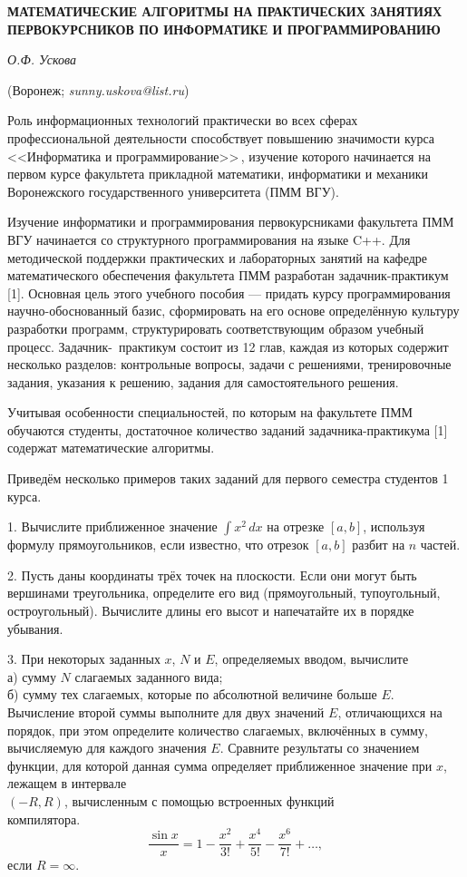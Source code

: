 \begin{center}
    {\bf МАТЕМАТИЧЕСКИЕ АЛГОРИТМЫ НА ПРАКТИЧЕСКИХ ЗАНЯТИЯХ ПЕРВОКУРСНИКОВ ПО ИНФОРМАТИКЕ И ПРОГРАММИРОВАНИЮ}

    {\it О.Ф. Ускова}

    (Воронеж; {\it sunny.uskova@list.ru})
\end{center}


Роль информационных технологий практически во всех сферах профессиональной деятельности способствует повышению значимости
курса <<Информатика и программирование>>\,, изучение которого начинается на первом курсе факультета прикладной математики,
информатики и механики Воронежского государственного университета \linebreak (ПММ ВГУ).

Изучение информатики и программирования первокурсниками факультета ПММ ВГУ начинается со структурного программирования
на языке C++. Для методической поддержки практических и лабораторных занятий на кафедре математического обеспечения
факультета ПММ разработан задачник-практикум [1]. Основная цель этого учебного пособия --- придать курсу программирования
научно-обоснованный базис, сформировать на его основе определённую культуру разработки программ, структурировать
соответствующим образом учебный процесс. Задачник-~практикум состоит из 12 глав, каждая из которых содержит несколько
разделов: контрольные вопросы, задачи с решениями, тренировочные задания, указания к решению, задания для самостоятельного
решения.

Учитывая особенности специальностей, по которым на факультете ПММ обучаются студенты, достаточное количество заданий
задачника-практикума [1] содержат математические алгоритмы.

Приведём несколько примеров таких заданий для первого семестра студентов 1 курса.

1. Вычислите приближенное значение $\int x^2\,dx$ на отрезке $[a, b]$, используя формулу прямоугольников, если
известно, что отрезок $[a, b]$ разбит на $n$ частей.

2. Пусть даны координаты трёх точек на плоскости. Если они могут быть вершинами треугольника, определите его
вид (прямоугольный, тупоугольный, остроугольный). Вычислите длины его высот и напечатайте их в порядке убывания.

3. При некоторых заданных $x$, $N$ и $E$, определяемых вводом, вычислите\\
а) сумму $N$ слагаемых заданного вида;\\
б) сумму тех слагаемых, которые по абсолютной величине больше $E$. Вычисление второй суммы выполните для двух значений $E$,
отличающихся на порядок, при этом определите количество слагаемых, включённых в сумму, вычисляемую для каждого значения
$E$. Сравните результаты со значением функции, для которой данная сумма определяет приближенное значение при $x$, лежащем в интервале
\\$(-R, R)$, вычисленным с помощью встроенных функций
\\компилятора.
$$
\frac{\sin x}{x}=1-\frac{x^2}{3!}+\frac{x^4}{5!}-\frac{x^6}{7!}+\dots,
$$
если $R=\infty$.

